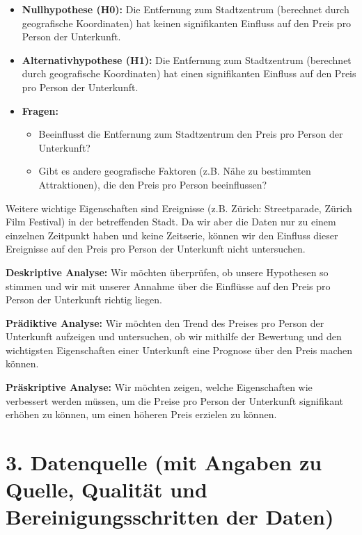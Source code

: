 \documentclass[
  journal,
]{IEEEtran}%
\providecommand{\tightlist}{%
  \setlength{\itemsep}{0pt}\setlength{\parskip}{0pt}}\usepackage{longtable,booktabs,array}
\begin{document}
\begin{enumerate}
  \begin{itemize}
  \item
    \textbf{Nullhypothese (H0):} Die Entfernung zum Stadtzentrum
    (berechnet durch geografische Koordinaten) hat keinen signifikanten
    Einfluss auf den Preis pro Person der Unterkunft.
  \item
    \textbf{Alternativhypothese (H1):} Die Entfernung zum Stadtzentrum
    (berechnet durch geografische Koordinaten) hat einen signifikanten
    Einfluss auf den Preis pro Person der Unterkunft.
  \item
    \textbf{Fragen:}

    \begin{itemize}
    \tightlist
    \item
      Beeinflusst die Entfernung zum Stadtzentrum den Preis pro Person
      der Unterkunft?
    \item
      Gibt es andere geografische Faktoren (z.B. Nähe zu bestimmten
      Attraktionen), die den Preis pro Person beeinflussen?
    \end{itemize}
  \end{itemize}
\end{enumerate}

Weitere wichtige Eigenschaften sind Ereignisse (z.B. Zürich:
Streetparade, Zürich Film Festival) in der betreffenden Stadt. Da wir
aber die Daten nur zu einem einzelnen Zeitpunkt haben und keine
Zeitserie, können wir den Einfluss dieser Ereignisse auf den Preis pro
Person der Unterkunft nicht untersuchen.

\textbf{Deskriptive Analyse:} Wir möchten überprüfen, ob unsere
Hypothesen so stimmen und wir mit unserer Annahme über die Einflüsse auf
den Preis pro Person der Unterkunft richtig liegen.

\textbf{Prädiktive Analyse:} Wir möchten den Trend des Preises pro
Person der Unterkunft aufzeigen und untersuchen, ob wir mithilfe der
Bewertung und den wichtigsten Eigenschaften einer Unterkunft eine
Prognose über den Preis machen können.

\textbf{Präskriptive Analyse:} Wir möchten zeigen, welche Eigenschaften
wie verbessert werden müssen, um die Preise pro Person der Unterkunft
signifikant erhöhen zu können, um einen höheren Preis erzielen zu
können.

\section{3. Datenquelle (mit Angaben zu Quelle, Qualität und
Bereinigungsschritten der
Daten)}\label{datenquelle-mit-angaben-zu-quelle-qualituxe4t-und-bereinigungsschritten-der-daten}
\end{document}
